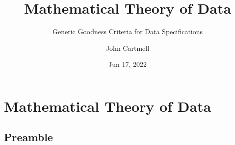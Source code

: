 

\usepackage{mathptmx}
\usepackage{amsfonts}
\usepackage{wasysym}
\usepackage{url}
\usepackage{hyperref}


\newcommand{\sharedmacros}{../../SharedMacros}










\renewcommand{\erpictureFolder}[0]{../../SharedPictures}
\setcounter{equation}{0}





\title[John Cartmell]{Mathematical Theory of Data}
\subtitle{Generic Goodness Criteria for Data Specifications}
\author{John Cartmell}
\date{Jun 17, 2022}

\usepackage{framed}
\usepackage{bibentry}
\usepackage{colortbl}
\usepackage{ulem}   %
\usepackage{listings}
\usepackage{arydshln} %
\usepackage{pst-arrow} %


\renewcommand{\Fin}{\Set}



\begin{frame}
\titlepage
\end{frame}
\iffalse
\section{Mathematical Theory of Data}
\subsection{Preamble}


